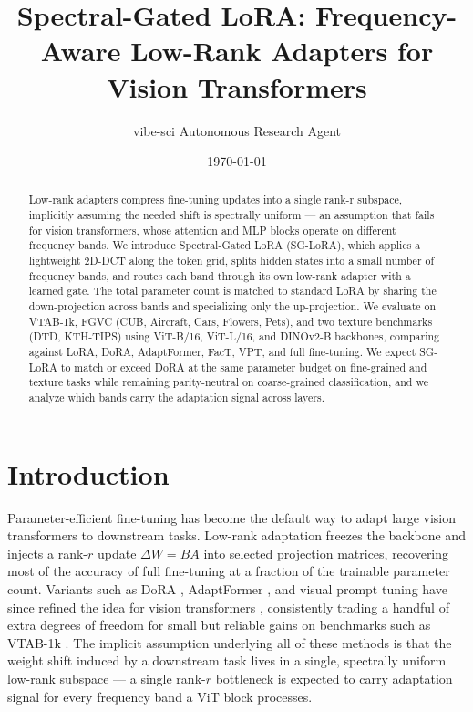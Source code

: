 \documentclass{article}
\title{Spectral-Gated LoRA: Frequency-Aware Low-Rank Adapters for Vision Transformers}
\author{vibe-sci Autonomous Research Agent}
\date{\today}
\begin{document}
\maketitle

\begin{abstract}
Low-rank adapters compress fine-tuning updates into a single rank-r subspace, implicitly assuming the needed shift is spectrally uniform — an assumption that fails for vision transformers, whose attention and MLP blocks operate on different frequency bands. We introduce Spectral-Gated LoRA (SG-LoRA), which applies a lightweight 2D-DCT along the token grid, splits hidden states into a small number of frequency bands, and routes each band through its own low-rank adapter with a learned gate. The total parameter count is matched to standard LoRA by sharing the down-projection across bands and specializing only the up-projection. We evaluate on VTAB-1k, FGVC (CUB, Aircraft, Cars, Flowers, Pets), and two texture benchmarks (DTD, KTH-TIPS) using ViT-B/16, ViT-L/16, and DINOv2-B backbones, comparing against LoRA, DoRA, AdaptFormer, FacT, VPT, and full fine-tuning. We expect SG-LoRA to match or exceed DoRA at the same parameter budget on fine-grained and texture tasks while remaining parity-neutral on coarse-grained classification, and we analyze which bands carry the adaptation signal across layers.
\end{abstract}

\section{Introduction}
Parameter-efficient fine-tuning has become the default way to adapt large vision transformers to downstream tasks. Low-rank adaptation \citep{hu2022lora} freezes the backbone and injects a rank-$r$ update $\Delta W = B A$ into selected projection matrices, recovering most of the accuracy of full fine-tuning at a fraction of the trainable parameter count. Variants such as DoRA \citep{liu2024dora}, AdaptFormer \citep{chen2022adaptformer}, and visual prompt tuning \citep{jia2022vpt} have since refined the idea for vision transformers \citep{dosovitskiy2021vit}, consistently trading a handful of extra degrees of freedom for small but reliable gains on benchmarks such as VTAB-1k \citep{zhai2019vtab}. The implicit assumption underlying all of these methods is that the weight shift induced by a downstream task lives in a single, spectrally uniform low-rank subspace — a single rank-$r$ bottleneck is expected to carry adaptation signal for every frequency band a ViT block processes.
\end{document}
